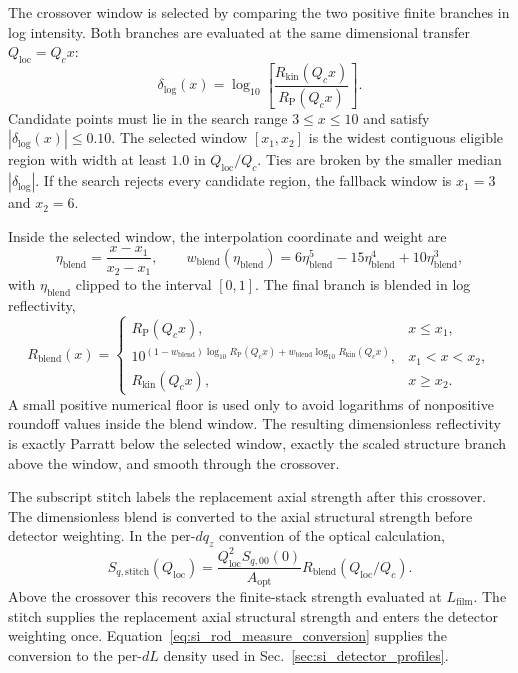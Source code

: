The crossover window is selected by comparing the two positive finite branches in
log intensity. Both branches are evaluated at the same dimensional transfer $Q_{\mathrm{loc}}=Q_c x$:
\begin{equation}
  \delta_{\log}(x)=\log_{10}\!\left[\frac{R_{\mathrm{kin}}(Q_c x)}{R_{\mathrm P}(Q_c x)}\right].
  \label{eq:si_crossover_log_ratio}
\end{equation}
Candidate points must lie in the search range $3\le x\le10$ and satisfy
$|\delta_{\log}(x)|\le0.10$. The selected window $[x_1,x_2]$ is the widest contiguous
eligible region with width at least $1.0$ in $Q_{\mathrm{loc}}/Q_c$. Ties are broken by the
smaller median $|\delta_{\log}|$. If the search rejects every candidate region, the fallback window
is $x_1=3$ and $x_2=6$.

Inside the selected window, the interpolation coordinate and weight are
\begin{equation}
  \eta_{\mathrm{blend}}=\frac{x-x_1}{x_2-x_1},
  \qquad
  w_{\mathrm{blend}}(\eta_{\mathrm{blend}})=6\eta_{\mathrm{blend}}^5-15\eta_{\mathrm{blend}}^4+10\eta_{\mathrm{blend}}^3,
  \label{eq:si_crossover_smoothstep}
\end{equation}
with $\eta_{\mathrm{blend}}$ clipped to the interval $[0,1]$. The final branch is blended in log
reflectivity,
\begin{equation}
R_{\mathrm{blend}}(x)=
\begin{cases}
R_{\mathrm P}(Q_c x), & x\le x_1,\\[3pt]
10^{(1-w_{\mathrm{blend}})\log_{10}R_{\mathrm P}(Q_c x)+w_{\mathrm{blend}}\log_{10}R_{\mathrm{kin}}(Q_c x)},
  & x_1<x<x_2,\\[3pt]
R_{\mathrm{kin}}(Q_c x), & x\ge x_2.
\end{cases}
\label{eq:si_crossover_blend}
\end{equation}
A small positive numerical floor is used only to avoid logarithms of nonpositive
roundoff values inside the blend window. The resulting dimensionless reflectivity is exactly
Parratt below the selected window, exactly the scaled structure branch above the
window, and smooth through the crossover.


The subscript $\mathrm{stitch}$ labels the replacement axial strength after this crossover. The dimensionless blend is converted to the axial structural strength before detector weighting. In the per-$dq_z$ convention of the optical calculation,
\begin{equation}
S_{q,\mathrm{stitch}}(Q_{\mathrm{loc}})
=\frac{Q_{\mathrm{loc}}^2 S_{q,00}(0)}{A_{\mathrm{opt}}}R_{\mathrm{blend}}(Q_{\mathrm{loc}}/Q_c).
\label{eq:si_reflectivity_strength_conversion}
\end{equation}
Above the crossover this recovers the finite-stack strength evaluated at $L_{\mathrm{film}}$. The stitch supplies the replacement axial structural strength and enters the detector weighting once. Equation~\eqref{eq:si_rod_measure_conversion} supplies the conversion to the per-$dL$ density used in Sec.~\ref{sec:si_detector_profiles}.

